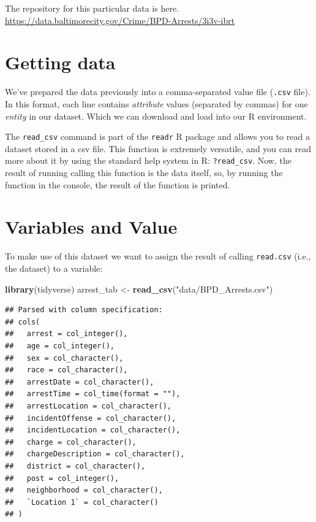 \documentclass[12pt,]{book}
\newenvironment{Shaded}{\begin{snugshade}}{\end{snugshade}}
\newcommand{\KeywordTok}[1]{\textcolor[rgb]{0.13,0.29,0.53}{\textbf{#1}}}
\newcommand{\StringTok}[1]{\textcolor[rgb]{0.31,0.60,0.02}{#1}}
\newcommand{\NormalTok}[1]{#1}
\theoremstyle{definition}
\theoremstyle{definition}
\theoremstyle{definition}
\theoremstyle{remark}
\begin{document}
The repository for this particular data is here.
\url{https://data.baltimorecity.gov/Crime/BPD-Arrests/3i3v-ibrt}

\section{Getting data}\label{getting-data}

We've prepared the data previously into a comma-separated value file
(\texttt{.csv} file). In this format, each line contains
\emph{attribute} values (separated by commas) for one \emph{entity} in
our dataset. Which we can download and load into our R environment.

The \texttt{read\_csv} command is part of the \texttt{readr} R package
and allows you to read a dataset stored in a csv file. This function is
extremely versatile, and you can read more about it by using the
standard help system in R: \texttt{?read\_csv}. Now, the result of
running calling this function is the data itself, so, by running the
function in the console, the result of the function is printed.

\section{Variables and Value}\label{variables-and-value}

To make use of this dataset we want to assign the result of calling
\texttt{read.csv} (i.e., the dataset) to a variable:

\begin{Shaded}
\begin{Highlighting}[]
\KeywordTok{library}\NormalTok{(tidyverse)}
\NormalTok{arrest_tab <-}\StringTok{ }\KeywordTok{read_csv}\NormalTok{(}\StringTok{"data/BPD_Arrests.csv"}\NormalTok{)}
\end{Highlighting}
\end{Shaded}

\begin{verbatim}
## Parsed with column specification:
## cols(
##   arrest = col_integer(),
##   age = col_integer(),
##   sex = col_character(),
##   race = col_character(),
##   arrestDate = col_character(),
##   arrestTime = col_time(format = ""),
##   arrestLocation = col_character(),
##   incidentOffense = col_character(),
##   incidentLocation = col_character(),
##   charge = col_character(),
##   chargeDescription = col_character(),
##   district = col_character(),
##   post = col_integer(),
##   neighborhood = col_character(),
##   `Location 1` = col_character()
## )
\end{verbatim}
\end{document}
